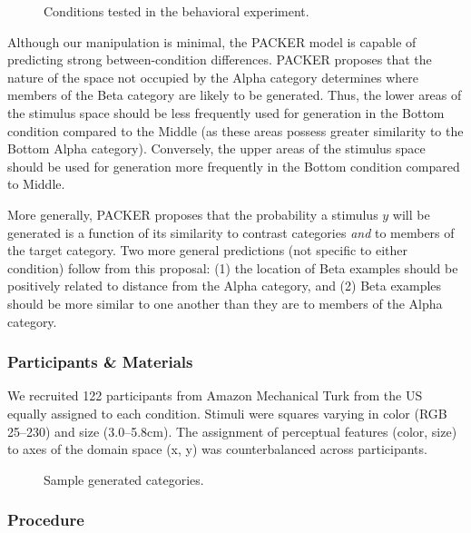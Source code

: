 \documentclass[10pt,letterpaper]{article}
\newcommand\inputpgf[2]{{
\let\pgfimageWithoutPath\pgfimage
\renewcommand{\pgfimage}[2][]{\pgfimageWithoutPath[##1]{#1/##2}}

}}
\begin{document}
\begin{figure}
    \begin{center}
    
    \caption{Conditions tested in the behavioral experiment.}
    \label{fig:middle-bottom-conditions}
    \end{center}
\end{figure}

Although our manipulation is minimal, the PACKER model is capable of predicting strong between-condition differences. PACKER proposes that the nature of the space not occupied by the Alpha category determines where members of the Beta category are likely to be generated. Thus, the lower areas of the stimulus space should be less frequently used for generation in the Bottom condition compared to the Middle (as these areas possess greater similarity to the Bottom Alpha category). Conversely, the upper areas of the stimulus space should be used for generation more frequently in the Bottom condition compared to Middle.

More generally, PACKER proposes that the probability a stimulus $y$ will be generated is a function of its similarity to contrast categories \textit{and} to members of the target category. Two more general predictions (not specific to either condition) follow from this proposal: (1) the location of Beta examples should be positively related to distance from the Alpha category, and (2) Beta examples should be more similar to one another than they are to members of the Alpha category.

\subsubsection{Participants \& Materials}
We recruited 122 participants from Amazon Mechanical Turk from the US equally assigned to each condition. Stimuli were squares varying in color (RGB 25--230) and size (3.0--5.8cm). The assignment of perceptual features (color, size) to axes of the domain space (x, y) was counterbalanced across participants.

\begin{figure}[ht!]
    \begin{center}
    \inputpgf{figs/}{beta.samples.pgf}
    \caption{Sample generated categories. }
    \label{fig:beta.samples}
    \end{center}
\end{figure}

\subsubsection{Procedure}
\end{document}
